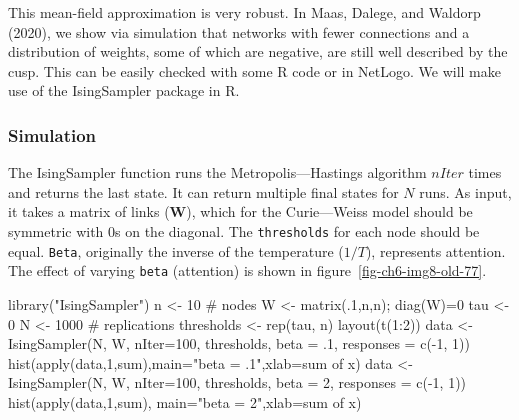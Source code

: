 \documentclass[
  a4paper,
  DIV=11,
  numbers=noendperiod,
  oneside]{scrreprt}
\newenvironment{Shaded}{}{}
\newcommand{\AttributeTok}[1]{\textcolor[rgb]{0.84,0.23,0.29}{#1}}
\newcommand{\CommentTok}[1]{\textcolor[rgb]{0.42,0.45,0.49}{#1}}
\newcommand{\DecValTok}[1]{\textcolor[rgb]{0.00,0.36,0.77}{#1}}
\newcommand{\FunctionTok}[1]{\textcolor[rgb]{0.44,0.26,0.76}{#1}}
\newcommand{\NormalTok}[1]{\textcolor[rgb]{0.14,0.16,0.18}{#1}}
\newcommand{\OtherTok}[1]{\textcolor[rgb]{0.44,0.26,0.76}{#1}}
\newcommand{\SpecialCharTok}[1]{\textcolor[rgb]{0.00,0.36,0.77}{#1}}
\newcommand{\StringTok}[1]{\textcolor[rgb]{0.01,0.18,0.38}{#1}}
\begin{document}
This mean-field approximation is very robust. In Maas, Dalege, and
Waldorp (2020), we show via simulation that networks with fewer
connections and a distribution of weights, some of which are negative,
are still well described by the cusp. This can be easily checked with
some R code or in NetLogo. We will make use of the IsingSampler package
in R.

\subsubsection{Simulation}\label{sec-Simulation}

The IsingSampler function runs the Metropolis---Hastings algorithm
\(nIter\) times and returns the last state. It can return multiple final
states for \(N\) runs. As input, it takes a matrix of links
(\(\mathbf{W}\)), which for the Curie---Weiss model should be symmetric
with 0s on the diagonal. The \texttt{thresholds} for each node should be
equal. \texttt{Beta}, originally the inverse of the temperature
(\(1/T\)), represents attention. The effect of varying \texttt{beta}
(attention) is shown in figure~\ref{fig-ch6-img8-old-77}.

\begin{Shaded}
\begin{Highlighting}[]
\FunctionTok{library}\NormalTok{(}\StringTok{"IsingSampler"}\NormalTok{)}
\NormalTok{n }\OtherTok{\textless{}{-}} \DecValTok{10} \CommentTok{\# nodes}
\NormalTok{W }\OtherTok{\textless{}{-}} \FunctionTok{matrix}\NormalTok{(.}\DecValTok{1}\NormalTok{,n,n); }\FunctionTok{diag}\NormalTok{(W)}\OtherTok{=}\DecValTok{0}
\NormalTok{tau }\OtherTok{\textless{}{-}} \DecValTok{0}
\NormalTok{N }\OtherTok{\textless{}{-}} \DecValTok{1000} \CommentTok{\# replications}
\NormalTok{thresholds }\OtherTok{\textless{}{-}} \FunctionTok{rep}\NormalTok{(tau, n)}
\FunctionTok{layout}\NormalTok{(}\FunctionTok{t}\NormalTok{(}\DecValTok{1}\SpecialCharTok{:}\DecValTok{2}\NormalTok{))}
\NormalTok{data }\OtherTok{\textless{}{-}} \FunctionTok{IsingSampler}\NormalTok{(N, W, }\AttributeTok{nIter=}\DecValTok{100}\NormalTok{, thresholds, }
            \AttributeTok{beta =}\NormalTok{ .}\DecValTok{1}\NormalTok{, }\AttributeTok{responses =} \FunctionTok{c}\NormalTok{(}\SpecialCharTok{{-}}\DecValTok{1}\NormalTok{, }\DecValTok{1}\NormalTok{))}
\FunctionTok{hist}\NormalTok{(}\FunctionTok{apply}\NormalTok{(data,}\DecValTok{1}\NormalTok{,sum),}\AttributeTok{main=}\StringTok{"beta = .1"}\NormalTok{,}\AttributeTok{xlab=}\StringTok{\textquotesingle{}sum of x\textquotesingle{}}\NormalTok{)}
\NormalTok{data }\OtherTok{\textless{}{-}} \FunctionTok{IsingSampler}\NormalTok{(N, W, }\AttributeTok{nIter=}\DecValTok{100}\NormalTok{, thresholds, }
            \AttributeTok{beta =} \DecValTok{2}\NormalTok{, }\AttributeTok{responses =} \FunctionTok{c}\NormalTok{(}\SpecialCharTok{{-}}\DecValTok{1}\NormalTok{, }\DecValTok{1}\NormalTok{))}
\FunctionTok{hist}\NormalTok{(}\FunctionTok{apply}\NormalTok{(data,}\DecValTok{1}\NormalTok{,sum), }\AttributeTok{main=}\StringTok{"beta = 2"}\NormalTok{,}\AttributeTok{xlab=}\StringTok{\textquotesingle{}sum of x\textquotesingle{}}\NormalTok{)}
\end{Highlighting}
\end{Shaded}
\end{document}
